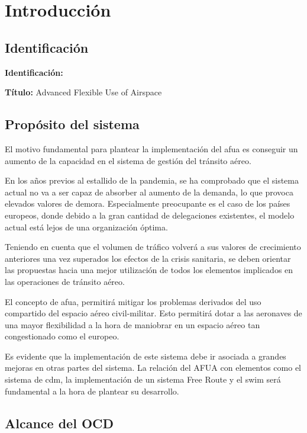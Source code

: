 \chapter{Introducción}

\section{Identificación}

\textbf{Identificación:}

\textbf{Título:} Advanced Flexible Use of Airspace 

\section{Propósito del sistema}

El motivo fundamental para plantear la implementación del \acrfull{afua} es conseguir un aumento de la capacidad en el sistema de gestión del tránsito aéreo. 

En los años previos al estallido de la pandemia, se ha comprobado que el sistema actual no va a ser capaz de absorber al aumento de la demanda, lo que provoca elevados valores de demora. Especialmente preocupante es el caso de los países europeos, donde debido a la gran cantidad de delegaciones existentes, el modelo actual está lejos de una organización óptima. 

Teniendo en cuenta que el volumen de tráfico volverá a sus valores de crecimiento anteriores una vez superados los efectos de la crisis sanitaria, se deben orientar las propuestas hacia una mejor utilización de todos los elementos implicados en las operaciones de tránsito aéreo. 

El concepto de \acrlong{afua}, permitirá mitigar los problemas derivados del uso compartido del espacio aéreo civil-militar. Esto permitirá dotar a las aeronaves de una mayor flexibilidad a la hora de maniobrar en un espacio aéreo tan congestionado como el europeo. 

Es evidente que la implementación de este sistema debe ir asociada a grandes mejoras en otras partes del sistema. La relación del AFUA con elementos como el sistema de \acrfull{cdm}, la implementación de un sistema Free Route y el \acrfull{swim} será fundamental a la hora de plantear su desarrollo. 

\section{Alcance del OCD}

